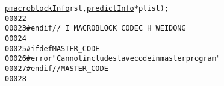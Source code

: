 \begin{footnotesize}
\begin{alltt}
      \hyperlink{structmacroblock_info}{pmacroblockInfo} rst, \hyperlink{structpredict_info}{predictInfo} *plist);
00022 
00023 \textcolor{preprocessor}{#endif //\_I\_MACROBLOCK\_CODEC\_H\_WEIDONG\_}
00024 \textcolor{preprocessor}{}
00025 \textcolor{preprocessor}{#ifdef MASTER\_CODE}
00026 \textcolor{preprocessor}{}\textcolor{preprocessor}{#error "Can not include slave code in master program"}
00027 \textcolor{preprocessor}{}\textcolor{preprocessor}{#endif // MASTER\_CODE}
00028 \textcolor{preprocessor}{}
\end{alltt}\end{footnotesize}
